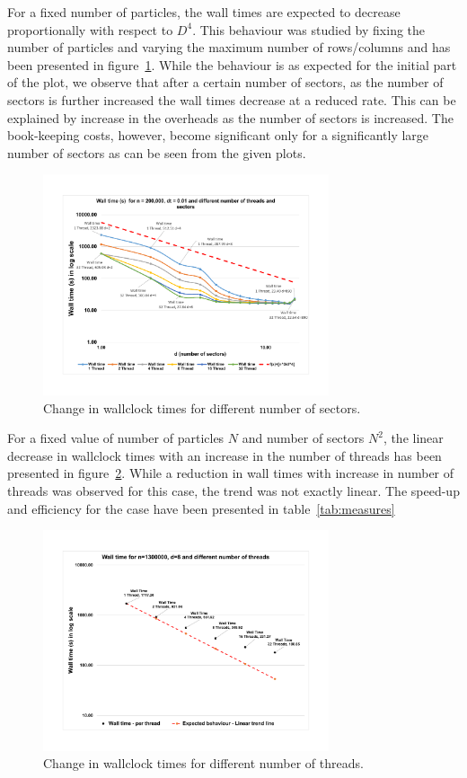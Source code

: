 \documentclass[11pt, oneside]{article}
\begin{document}
       For a fixed number of particles, the wall times are expected to decrease proportionally with respect to $D^4$. This behaviour was studied by fixing the number of particles and varying the maximum number of rows/columns and has been presented in figure~\ref{fig:D_scaling}. While the behaviour is as expected for the initial part of the plot, we observe that after a certain number of sectors, as the number of sectors is further increased the wall times decrease at a reduced rate. This can be explained by increase in the overheads as the number of sectors is increased. The book-keeping costs, however, become significant only for a significantly large number of sectors as can be seen from the given plots. 
        	\begin{figure}[h]
		\centering
		\includegraphics[width=0.75\textwidth]{Figures/D.pdf}
		\caption{Change in wallclock times for different number of sectors.}
		\label{fig:D_scaling}
	\end{figure}

                For a fixed value of number of particles $N$ and number of sectors $N^2$, the linear decrease in wallclock times with an increase in the number of threads has been presented in figure~\ref{fig:Threads}. While a reduction in wall times with increase in number of threads was observed for this case, the trend was not exactly linear. The speed-up and efficiency for the case have been presented in table~\ref{tab:measures}
	\begin{figure}[h]
		\centering
		\includegraphics[width=0.75\textwidth]{Figures/Threads.pdf}
		\caption{Change in wallclock times for different number of threads.}
		\label{fig:Threads}
	\end{figure}
                
\end{document}
